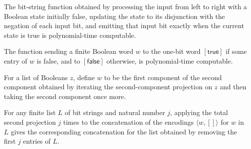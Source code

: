 \begin{theorem}
\label{Complexity.BinArith.polyTimeComputable_uRest}
\leanok
{}
The bit-string function obtained by processing the input from left to right with a
Boolean state initially false, updating the state to its disjunction with the negation
of each input bit, and emitting that input bit exactly when the current state is true is
polynomial-time computable.
\end{theorem}

\begin{theorem}
\label{Complexity.BinArith.polyTimeComputable_hasFalse}
\leanok
{}
The function sending a finite Boolean word $w$ to the one-bit word $[\mathsf{true}]$ if
some entry of $w$ is false, and to $[\mathsf{false}]$ otherwise, is polynomial-time
computable.
\end{theorem}

\begin{definition}
\label{Complexity.BinArith.getW}
\leanok
{}
For a list of Booleans $z$, define $w$ to be the first component of the second component
obtained by iterating the second-component projection on $z$ and then taking the second
component once more.
\end{definition}

\begin{theorem}
\label{Complexity.BinArith.iterate_pairSndD_encWords}
\leanok
{}
For any finite list $L$ of bit strings and natural number $j$, applying the total second
projection $j$ times to the concatenation of the encodings $\langle w,[]\rangle$ for $w$
in $L$ gives the corresponding concatenation for the list obtained by removing the first
$j$ entries of $L$.
\end{theorem}


